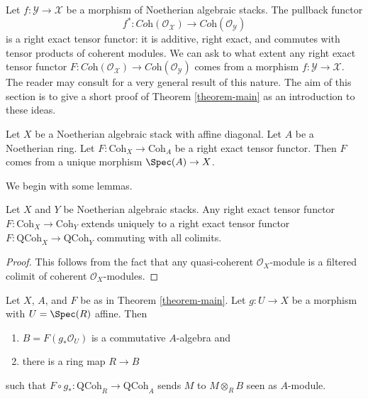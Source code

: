 \noindent
Let $f : \mathcal{Y} \to \mathcal{X}$ be a morphism of Noetherian
algebraic stacks. The pullback functor
$$
f^* :
\textit{Coh}(\mathcal{O}_\mathcal{X})
\longrightarrow
\textit{Coh}(\mathcal{O}_\mathcal{Y})
$$
is a right exact tensor functor: it is additive, right exact,
and commutes with tensor products of coherent modules. We can
ask to what extent any right exact tensor functor
$F : \textit{Coh}(\mathcal{O}_\mathcal{X}) \to
\textit{Coh}(\mathcal{O}_\mathcal{Y})$ comes from a
morphism $f : \mathcal{Y} \to \mathcal{X}$.
The reader may consult
\cite{Hall-Rydh-coherent} for a very general result
of this nature.
The aim of this section is to give a short proof of
Theorem \ref{theorem-main} as an introduction to these ideas.

\begin{theorem}
\label{theorem-main}
Let $X$ be a Noetherian algebraic stack with affine diagonal.
Let $A$ be a Noetherian ring.
Let $F : \text{Coh}_X \to \text{Coh}_A$ be a right exact tensor functor.
Then $F$ comes from a unique morphism $\Spec(A) \to X$.
\end{theorem}

\noindent
We begin with some lemmas.

\begin{lemma}
\label{lemma-extend}
Let $X$ and $Y$ be Noetherian algebraic stacks. Any right exact tensor
functor $F : \text{Coh}_X \to \text{Coh}_Y$ extends uniquely to a right exact
tensor functor $F : \text{QCoh}_X \to \text{QCoh}_Y$ commuting with
all colimits.
\end{lemma}

\begin{proof}
This follows from the fact that any quasi-coherent $\mathcal{O}_X$-module
is a filtered colimit of coherent $\mathcal{O}_X$-modules.
\end{proof}

\begin{lemma}
\label{lemma-affine}
Let $X$, $A$, and $F$ be as in Theorem \ref{theorem-main}. Let $g : U \to X$
be a morphism with $U = \Spec(R)$ affine. Then
\begin{enumerate}
\item $B = F(g_*\mathcal{O}_U)$ is a commutative $A$-algebra and
\item there is a ring map $R \to B$
\end{enumerate}
such that $F \circ g_* : \text{QCoh}_R \to \text{QCoh}_A$
sends $M$ to $M \otimes_R B$ seen as $A$-module.
\end{lemma}

